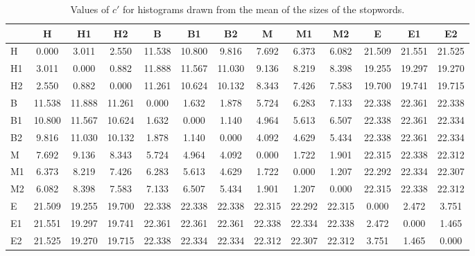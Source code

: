 \begin{table*}[h!]
\begin{center}
\begin{tabular}{| l | c | c | c | c | c | c | c | c | c | c | c | c |}\hline
 & H & H1 & H2 & B & B1 & B2 & M & M1 & M2 & E & E1 & E2 \\\hline
H & 0.000  & 3.011  & 2.550  & 11.538  & 10.800  & 9.816  & 7.692  & 6.373  & 6.082  & 21.509  & 21.551  & 21.525 \\\hline
H1 & 3.011  & 0.000  & 0.882  & 11.888  & 11.567  & 11.030  & 9.136  & 8.219  & 8.398  & 19.255  & 19.297  & 19.270 \\\hline
H2 & 2.550  & 0.882  & 0.000  & 11.261  & 10.624  & 10.132  & 8.343  & 7.426  & 7.583  & 19.700  & 19.741  & 19.715 \\\hline
B & 11.538  & 11.888  & 11.261  & 0.000  & 1.632  & 1.878  & 5.724  & 6.283  & 7.133  & 22.338  & 22.361  & 22.338 \\\hline
B1 & 10.800  & 11.567  & 10.624  & 1.632  & 0.000  & 1.140  & 4.964  & 5.613  & 6.507  & 22.338  & 22.361  & 22.334 \\\hline
B2 & 9.816  & 11.030  & 10.132  & 1.878  & 1.140  & 0.000  & 4.092  & 4.629  & 5.434  & 22.338  & 22.361  & 22.334 \\\hline
M & 7.692  & 9.136  & 8.343  & 5.724  & 4.964  & 4.092  & 0.000  & 1.722  & 1.901  & 22.315  & 22.338  & 22.312 \\\hline
M1 & 6.373  & 8.219  & 7.426  & 6.283  & 5.613  & 4.629  & 1.722  & 0.000  & 1.207  & 22.292  & 22.334  & 22.307 \\\hline
M2 & 6.082  & 8.398  & 7.583  & 7.133  & 6.507  & 5.434  & 1.901  & 1.207  & 0.000  & 22.315  & 22.338  & 22.312 \\\hline
E & 21.509  & 19.255  & 19.700  & 22.338  & 22.338  & 22.338  & 22.315  & 22.292  & 22.315  & 0.000  & 2.472  & 3.751 \\\hline
E1 & 21.551  & 19.297  & 19.741  & 22.361  & 22.361  & 22.361  & 22.338  & 22.334  & 22.338  & 2.472  & 0.000  & 1.465 \\\hline
E2 & 21.525  & 19.270  & 19.715  & 22.338  & 22.334  & 22.334  & 22.312  & 22.307  & 22.312  & 3.751  & 1.465  & 0.000 \\\hline
\end{tabular}
\caption{Values of $c'$ for histograms drawn from the mean of the sizes of the stopwords.}
\end{center}
\end{table*}